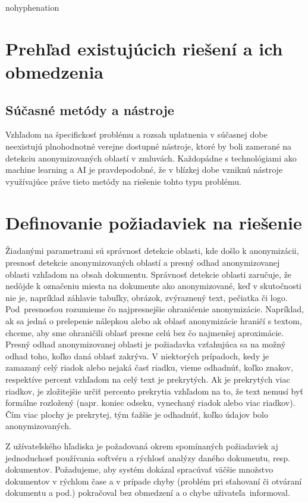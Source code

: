 \begin{hyphenrules}{nohyphenation}
\section{Prehľad existujúcich riešení a ich obmedzenia}
\subsection{Súčasné metódy a nástroje}
Vzhľadom na špecifickosť problému a rozsah uplatnenia v súčasnej dobe neexistujú plnohodnotné verejne dostupné nástroje, ktoré by boli zamerané na detekciu anonymizovaných oblastí v zmluvách. Každopádne s technológiami ako machine learning a AI je pravdepodobné, že v blízkej dobe vzniknú nástroje využívajúce práve tieto metódy na riešenie tohto typu problému.

\section{Definovanie požiadaviek na riešenie}

Žiadanými parametrami sú správnosť detekcie oblasti, kde došlo k anonymizácii, presnosť detekcie anonymizovaných oblastí a presný odhad anonymizovanej oblasti vzhľadom na obsah dokumentu. Správnosť detekcie oblasti zaručuje, že nedôjde k označeniu miesta na dokumente ako anonymizované, keď v skutočnosti nie je, napríklad záhlavie tabuľky, obrázok, zvýraznený text, pečiatka či logo. Pod~presnosťou rozumieme čo najpresnejšie ohraničenie anonymizácie. Napríklad, ak sa jedná o prelepenie nálepkou alebo ak oblasť anonymizácie hraničí s textom, chceme, aby sme ohraničili oblasť presne celú bez čo najmenšej aproximácie. Presný odhad anonymizovanej oblasti je požiadavka vzťahujúca sa na možný odhad toho, koľko daná oblasť zakrýva. V niektorých prípadoch, kedy je zamazaný celý riadok alebo nejaká časť riadku, vieme odhadnúť, koľko znakov, respektíve percent vzhľadom na celý text je prekrytých. Ak je prekrytých viac riadkov, je zložitejšie určiť percento prekrytia vzhľadom na to, že text nemusí byť formálne rozložený (napr. koniec odseku, vynechaný riadok alebo viac riadkov). Čím viac plochy je prekrytej, tým ťažšie je odhadnúť, koľko údajov bolo anonymizovaných.
\newline

Z užívateľského hľadiska je požadovaná okrem spomínaných požiadaviek aj jednoduchosť používania softvéru a rýchlosť analýzy daného dokumentu, resp. dokumentov. Požadujeme, aby systém dokázal spracúvať väčšie množstvo dokumentov v rýchlom čase a v prípade chyby (problém pri sťahovaní či otváraní dokumentu a pod.) pokračoval bez obmedzení a o chybe uživateľa~informoval. 
\end{hyphenrules}
